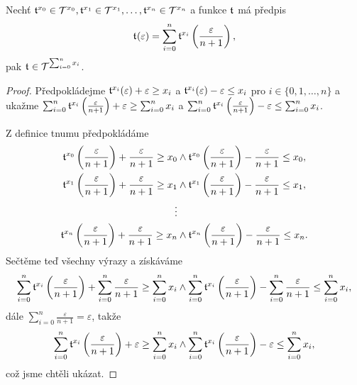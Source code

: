 \begin{theorem}
Nechť $\mathfrak{t}^{x_0}\in\mathcal{T}^{x_0}, \mathfrak{t}^{x_1}\in\mathcal{T}^{x_1}, \ldots, \mathfrak{t}^{x_n}\in\mathcal{T}^{x_n}$ a funkce $\mathfrak{t}^{}$ má předpis
\begin{equation}
\mathfrak{t}^{}(\varepsilon)=\sum_{i=0}^n\mathfrak{t}^{x_i}\left(\frac{\varepsilon}{n+1}\right),
\end{equation}
pak $\mathfrak{t}^{}\in\mathcal{T}^{\sum_{i=0}^nx_i}$.

\begin{proof}
Předpokládejme $\mathfrak{t}^{x_i}(\varepsilon) + \varepsilon \geq x_i$ a $\mathfrak{t}^{x_i}(\varepsilon) - \varepsilon \leq x_i$ pro $i \in \{0, 1, \ldots , n\}$ a ukažme $\sum_{i=0}^n\mathfrak{t}^{x_i}\left(\frac{\varepsilon}{n+1}\right) + \varepsilon \geq \sum_{i=0}^nx_i$ a $\sum_{i=0}^n\mathfrak{t}^{x_i}\left(\frac{\varepsilon}{n+1}\right) - \varepsilon \leq \sum_{i=0}^nx_i$.

Z definice tnumu předpokládáme
\begin{equation}
\begin{aligned}
\mathfrak{t}^{x_0}\left(\frac{\varepsilon}{n+1}\right)+\frac{\varepsilon}{n+1}\geq x_0 &\land \mathfrak{t}^{x_0}\left(\frac{\varepsilon}{n+1}\right)-\frac{\varepsilon}{n+1}\leq x_0,\\
\mathfrak{t}^{x_1}\left(\frac{\varepsilon}{n+1}\right)+\frac{\varepsilon}{n+1}\geq x_1 &\land \mathfrak{t}^{x_1}\left(\frac{\varepsilon}{n+1}\right)-\frac{\varepsilon}{n+1}\leq x_1,\\
\vdots \\
\mathfrak{t}^{x_n}\left(\frac{\varepsilon}{n+1}\right)+\frac{\varepsilon}{n+1}\geq x_n &\land \mathfrak{t}^{x_n}\left(\frac{\varepsilon}{n+1}\right)-\frac{\varepsilon}{n+1}\leq x_n.\\
\end{aligned}
\end{equation}
Sečtěme teď všechny výrazy a získáváme
\begin{equation}
\sum_{i=0}^n\mathfrak{t}^{x_i}\left(\frac{\varepsilon}{n+1}\right) + \sum_{i=0}^n\frac{\varepsilon}{n+1} \geq \sum_{i=0}^nx_i \land \sum_{i=0}^n\mathfrak{t}^{x_i}\left(\frac{\varepsilon}{n+1}\right) - \sum_{i=0}^n\frac{\varepsilon}{n+1} \leq \sum_{i=0}^nx_i,
\end{equation}
dále $\sum_{i=0}^n\frac{\varepsilon}{n+1} = \varepsilon$, takže
\begin{equation}
\sum_{i=0}^n\mathfrak{t}^{x_i}\left(\frac{\varepsilon}{n+1}\right) + \varepsilon \geq \sum_{i=0}^nx_i \land \sum_{i=0}^n\mathfrak{t}^{x_i}\left(\frac{\varepsilon}{n+1}\right) - \varepsilon \leq \sum_{i=0}^nx_i,
\end{equation}
což jsme chtěli ukázat.
\end{proof}
\end{theorem}

